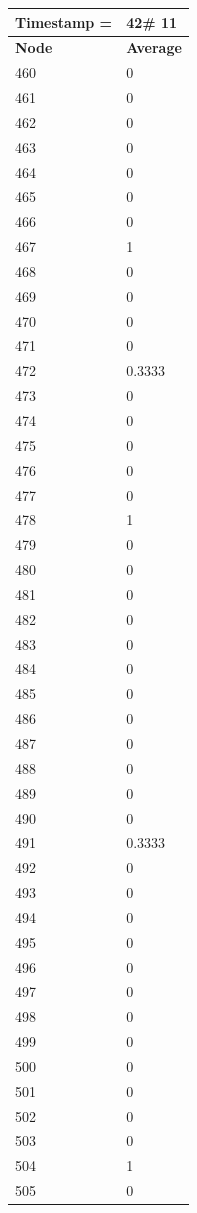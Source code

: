 \begin{tabular}{|l||l|}
\hline
\textbf{Timestamp =} & \textbf{42}\# 11\\\hline
	\textbf{Node} & \textbf{Average} \\ \hline
\hline
	460 & 0 \\ \hline
	461 & 0 \\ \hline
	462 & 0 \\ \hline
	463 & 0 \\ \hline
	464 & 0 \\ \hline
	465 & 0 \\ \hline
	466 & 0 \\ \hline
	467 & 1 \\ \hline
	468 & 0 \\ \hline
	469 & 0 \\ \hline
	470 & 0 \\ \hline
	471 & 0 \\ \hline
	472 & 0.3333 \\ \hline
	473 & 0 \\ \hline
	474 & 0 \\ \hline
	475 & 0 \\ \hline
	476 & 0 \\ \hline
	477 & 0 \\ \hline
	478 & 1 \\ \hline
	479 & 0 \\ \hline
	480 & 0 \\ \hline
	481 & 0 \\ \hline
	482 & 0 \\ \hline
	483 & 0 \\ \hline
	484 & 0 \\ \hline
	485 & 0 \\ \hline
	486 & 0 \\ \hline
	487 & 0 \\ \hline
	488 & 0 \\ \hline
	489 & 0 \\ \hline
	490 & 0 \\ \hline
	491 & 0.3333 \\ \hline
	492 & 0 \\ \hline
	493 & 0 \\ \hline
	494 & 0 \\ \hline
	495 & 0 \\ \hline
	496 & 0 \\ \hline
	497 & 0 \\ \hline
	498 & 0 \\ \hline
	499 & 0 \\ \hline
	500 & 0 \\ \hline
	501 & 0 \\ \hline
	502 & 0 \\ \hline
	503 & 0 \\ \hline
	504 & 1 \\ \hline
	505 & 0 \\ \hline
\end{tabular}
